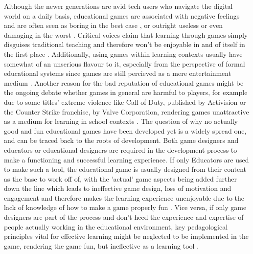 Although the newer generations are avid tech users who navigate the digital world on a daily basis, educational games are associated with negative feelings and are often seen as boring in the best case \cite{model} \cite{domestic}, or outright useless or even damaging in the worst \cite{domestic} \cite{lifelong}.
Critical voices claim that learning through games simply disguises traditional teaching and therefore won't be enjoyable in and of itself in the first place \cite{domestic}.
Additionally, using games within learning contexts usually have somewhat of an unserious flavour to it, especially from the perspective of formal educational systems since games are still percieved as a mere entertainment medium \cite{lifelong}.
Another reason for the bad reputation of educational games might be the ongoing debate whether games in general are harmful to players, for example due to some titles' extreme violence like Call of Duty, published by Activision or the Counter Strike franchise, by Valve Corporation, rendering games unattractive as a medium for learning in school contexts \cite{domestic}.
The question of why no actually good and fun educational games have been developed yet is a widely spread one, and can be traced back to the roots of development. Both game designers and educators or educational designers are required in the development process to make a functioning and successful learning experience. If only Educators are used to make such a tool, the educational game is usually designed from their content as the base to work off of, with the 'actual' game aspects being added further down the line which leads to ineffective game design, loss of motivation and engagement \cite{framework} and therefore makes the learning experience unenjoyable due to the lack of knowledge of how to make a game properly fun \cite{online}.
Vice versa, if only game designers are part of the process and don't heed the experience and expertise of people actually working in the educational environment, key pedagological principles vital for effective learning might be neglected to be implemented in the game, rendering the game fun, but ineffective as a learning tool \cite{online}.